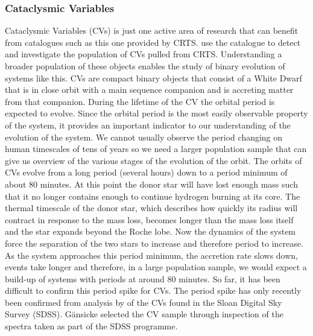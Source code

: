 \documentclass[a4paper,fleqn,usenatbib]{mnras}
\begin{document}
\subsubsection{Cataclysmic Variables}
Cataclysmic Variables (CVs) is just one active area of research that can benefit from catalogues such as this one provided by CRTS. \citet{Breedt2014} use the catalogue to detect and investigate the population of CVs pulled from CRTS. Understanding a broader population of these objects enables the study of binary evolution of systems like this. CVs are compact binary objects that consist of a White Dwarf that is in close orbit with a main sequence companion and is accreting matter from that companion. During the lifetime of the CV the orbital period is expected to evolve. Since the orbital period is the most easily observable property of the system, it provides an important indicator to our understanding of the evolution of the system. We cannot usually observe the period changing on human timescales of tens of years so we need a larger population sample that can give us overview of the various stages of the evolution of the orbit. The orbits of CVs evolve from a long period (several hours) down to a period minimum of about 80 minutes. At this point the donor star will have lost enough mass such that it no longer contains enough to continue hydrogen burning at its core. The thermal timescale of the donor star, which describes how quickly its radius will contract in response to the mass loss, becomes longer than the mass loss itself and the star expands beyond the Roche lobe. Now the dynamics of the system force the separation of the two stars to increase and therefore period to increase. As the system approaches this period minimum, the accretion rate slows down, events take longer and therefore, in a large population sample, we would expect a build-up of systems with periods at around 80 minutes. So far, it has been difficult to confirm this period spike for CVs.  The period spike has only recently been confirmed from analysis by \citet{Gaensicke2009} of the CVs found in the Sloan Digital Sky Survey (SDSS).  G{\"a}nsicke selected the CV sample through inspection of the spectra taken as part of the SDSS programme. 
\end{document}
